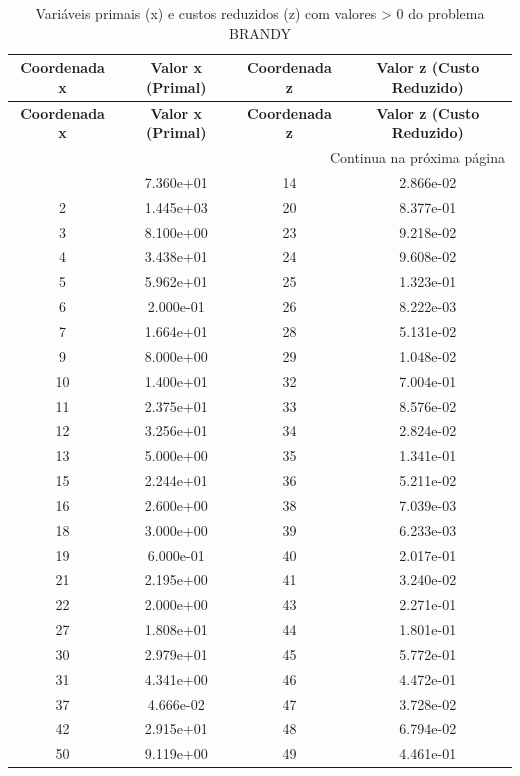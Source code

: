 \documentclass[12pt]{article}
\begin{document}
\begin{longtable}{@{}cccc@{}}
\caption{Variáveis primais (x) e custos reduzidos (z) com valores > 0 do problema BRANDY} \\
\toprule
\textbf{Coordenada x} & \textbf{Valor x (Primal)} & \textbf{Coordenada z} & \textbf{Valor z (Custo Reduzido)} \\
\midrule
\endfirsthead

\toprule
\textbf{Coordenada x} & \textbf{Valor x (Primal)} & \textbf{Coordenada z} & \textbf{Valor z (Custo Reduzido)} \\
\midrule
\endhead

\midrule \multicolumn{4}{r}{{Continua na próxima página}} \\ \midrule
\endfoot

\bottomrule
\endlastfoot
1 & 7.360e+01 & 14 & 2.866e-02 \\
2 & 1.445e+03 & 20 & 8.377e-01 \\
3 & 8.100e+00 & 23 & 9.218e-02 \\
4 & 3.438e+01 & 24 & 9.608e-02 \\
5 & 5.962e+01 & 25 & 1.323e-01 \\
6 & 2.000e-01 & 26 & 8.222e-03 \\
7 & 1.664e+01 & 28 & 5.131e-02 \\
9 & 8.000e+00 & 29 & 1.048e-02 \\
10 & 1.400e+01 & 32 & 7.004e-01 \\
11 & 2.375e+01 & 33 & 8.576e-02 \\
12 & 3.256e+01 & 34 & 2.824e-02 \\
13 & 5.000e+00 & 35 & 1.341e-01 \\
15 & 2.244e+01 & 36 & 5.211e-02 \\
16 & 2.600e+00 & 38 & 7.039e-03 \\
18 & 3.000e+00 & 39 & 6.233e-03 \\
19 & 6.000e-01 & 40 & 2.017e-01 \\
21 & 2.195e+00 & 41 & 3.240e-02 \\
22 & 2.000e+00 & 43 & 2.271e-01 \\
27 & 1.808e+01 & 44 & 1.801e-01 \\
30 & 2.979e+01 & 45 & 5.772e-01 \\
31 & 4.341e+00 & 46 & 4.472e-01 \\
37 & 4.666e-02 & 47 & 3.728e-02 \\
42 & 2.915e+01 & 48 & 6.794e-02 \\
50 & 9.119e+00 & 49 & 4.461e-01 \\

\end{longtable}
\end{document}
